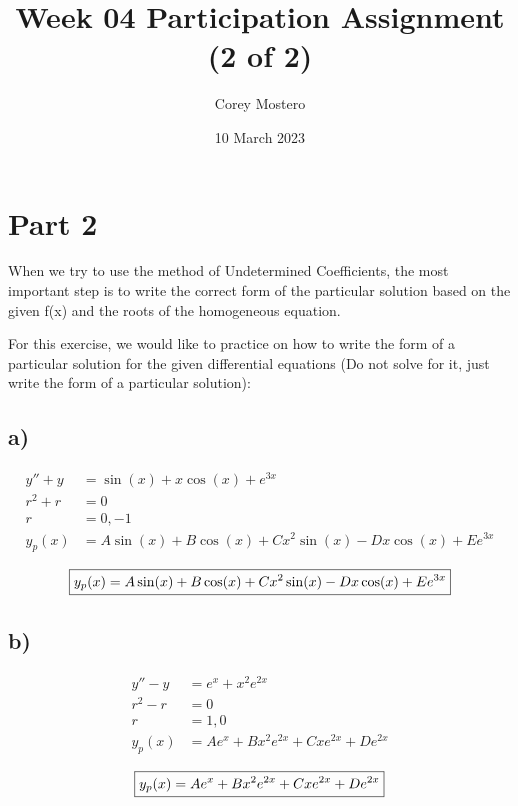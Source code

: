 \documentclass{article}
\title{Week 04 Participation Assignment (2 of 2)}
\date{10 March 2023}
\author{Corey Mostero}
\begin{document}
\newcommand{\hr}{\par\noindent\rule{\textwidth}{0.4pt}}

\newcommand{\bc}[1]{
	\begin{equation*}
		\begin{boxed}
			{#1}
		\end{boxed}
	\end{equation*}
}

\maketitle
\newpage

\tableofcontents

\section{Part 2}
When we try to use the method of Undetermined Coefficients, the most important step is to write the correct form of the particular solution based on the given f(x) and the roots of the homogeneous equation.

For this exercise, we would like to practice on how to write the form of a particular solution for the given differential equations (Do not solve for it, just write the form of a particular solution):

\subsection{a)}
\begin{align*}
	y'' + y & = \sin(x) + x\cos(x) + e^{3x} \\
	r^2 + r & = 0 \\
	r & = 0,-1 \\
	y_p(x) & = A\sin(x) + B\cos(x) + Cx^2\sin(x) - Dx\cos(x) + Ee^{3x}
\end{align*}
\bc{y_p(x) = A\sin(x) + B\cos(x) + Cx^2\sin(x) - Dx\cos(x) + Ee^{3x}}

\subsection{b)}
\begin{align*}
	y'' - y & = e^x + x^2e^{2x} \\
	r^2 - r & = 0 \\
	r & = 1,0 \\
	y_p(x) & = Ae^x + Bx^2e^{2x} + Cxe^{2x} + De^{2x}
\end{align*}
\bc{y_p(x) = Ae^x + Bx^2e^{2x} + Cxe^{2x} + De^{2x}}
\end{document}
